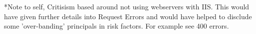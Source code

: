 *Note to self, Critisism based around not using webservers with IIS. This would have given further details into Request Errors and would have helped to disclude some 'over-banding' principals in risk factors. For example see 400 errors. 